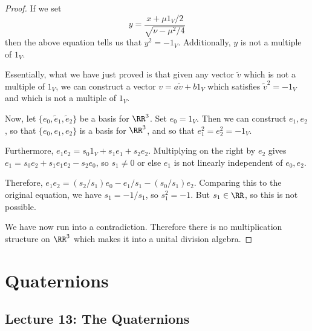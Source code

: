 \begin{proof}
    If we set 
    \[y = \frac{x+\mu1_V/2}{\sqrt{\nu-\mu^2/4}}\]
    then the above equation tells us that $y^2 = -1_V$. Additionally, $y$ is not a multiple of $1_V$. 

    Essentially, what we have just proved is that given any vector $\tilde{v}$ which is not a multiple of $1_V$, we can construct a vector $v = a\tilde{v}+b1_V$ which satisfies $\tilde{v}^2 =-1_V$ and which is not a multiple of $1_V$.

    Now, let $\{e_0,\tilde{e}_1,\tilde{e}_2\}$ be a basis for $\RR^3$. Set $e_0 = 1_V$. Then we can construct $e_1,e_2$, so that $\{e_0,e_1,e_2\}$ is a basis for $\RR^3$, and so that $e_1^2=e_2^2=-1_V$.

    Furthermore, $e_1e_2 = s_0 1_V + s_1 e_1 + s_2 e_2$. Multiplying on the right by $e_2$ gives $e_1 = s_0 e_2 + s_1 e_1 e_2 - s_2 e_0$, so $s_1 \neq 0$ or else $e_1$ is not linearly independent of $e_0,e_2$.

    Therefore, $e_1e_2 = (s_2/s_1)e_0-e_1/s_1-(s_0/s_1)e_2$. Comparing this to the original equation, we have $s_1 = -1/s_1$, so $s_1^2 = -1$. But $s_1 \in \RR$, so this is not possible.

    We have now run into a contradiction. Therefore there is no multiplication structure on $\RR^3$ which makes it into a unital division algebra.
\end{proof}

\section{Quaternions}
\subsection{Lecture 13: The Quaternions}
